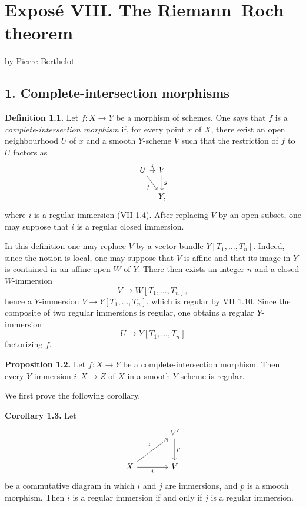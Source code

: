 \providecommand{\etale}{\'etale}
\providecommand{\Ch}{\operatorname{Ch}}


\section*{Expos\'e VIII. The Riemann--Roch theorem}
\begin{center}
by Pierre Berthelot
\end{center}

\subsection*{1. Complete-intersection morphisms}

\textbf{Definition 1.1.} Let $f:X\to Y$ be a morphism of schemes. One says that $f$ is a \emph{complete-intersection morphism} if, for every point $x$ of $X$, there exist an open neighbourhood $U$ of $x$ and a smooth $Y$-scheme $V$ such that the restriction of $f$ to $U$ factors as
\[
\begin{tikzcd}[column sep=tiny]
U \arrow[r,"i"] \arrow[dr,"f"'] & V \arrow[d,"g"]\\
& Y,
\end{tikzcd}
\]
where $i$ is a regular immersion (VII 1.4). After replacing $V$ by an open subset, one may suppose that $i$ is a regular closed immersion.

In this definition one may replace $V$ by a vector bundle $Y[T_1,\ldots,T_n]$. Indeed, since the notion is local, one may suppose that $V$ is affine and that its image in $Y$ is contained in an affine open $W$ of $Y$. There then exists an integer $n$ and a closed $W$-immersion
\[
V\longrightarrow W[T_1,\ldots,T_n],
\]
hence a $Y$-immersion $V\to Y[T_1,\ldots,T_n]$, which is regular by VII 1.10. Since the composite of two regular immersions is regular, one obtains a regular $Y$-immersion
\[
U\longrightarrow Y[T_1,\ldots,T_n]
\]
factorizing $f$.

\textbf{Proposition 1.2.} Let $f:X\to Y$ be a complete-intersection morphism. Then every $Y$-immersion $i:X\to Z$ of $X$ in a smooth $Y$-scheme is regular.

We first prove the following corollary.

\textbf{Corollary 1.3.} Let
\[
\begin{tikzcd}[column sep=large,row sep=large]
& V' \arrow[d,"p"]\\
X \arrow[ur,"j"] \arrow[r,"i"'] & V
\end{tikzcd}
\]
be a commutative diagram in which $i$ and $j$ are immersions, and $p$ is a smooth morphism. Then $i$ is a regular immersion if and only if $j$ is a regular immersion.

